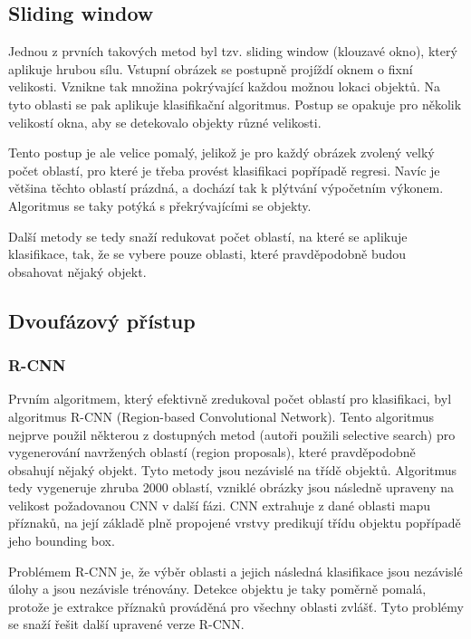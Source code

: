 \subsection{Sliding window}

Jednou z prvních takových metod byl tzv. sliding window (klouzavé okno), který
aplikuje hrubou sílu. Vstupní obrázek se postupně projíždí oknem o fixní
velikosti. Vznikne tak množina pokrývající každou možnou lokaci objektů. Na
tyto oblasti se pak aplikuje klasifikační algoritmus. Postup se opakuje pro
několik velikostí okna, aby se detekovalo objekty různé velikosti.

Tento postup je ale velice pomalý, jelikož je pro každý obrázek zvolený velký
počet oblastí, pro které je třeba provést klasifikaci popřípadě regresi. Navíc
je většina těchto oblastí prázdná, a dochází tak k plýtvání výpočetním výkonem.
Algoritmus se taky potýká s překrývajícími se objekty.

Další metody se tedy snaží redukovat počet oblastí, na které se aplikuje
klasifikace, tak, že se vybere pouze oblasti, které pravděpodobně budou
obsahovat nějaký objekt.

\subsection{Dvoufázový přístup}

\subsubsection{R-CNN}
Prvním algoritmem, který efektivně zredukoval počet oblastí pro klasifikaci,
byl algoritmus R-CNN (Region-based Convolutional Network). \cite{r-cnn} Tento
algoritmus nejprve použil některou z dostupných metod (autoři použili selective
search) pro vygenerování navržených oblastí (region proposals), které
pravděpodobně obsahují nějaký objekt. Tyto metody jsou nezávislé na třídě
objektů. Algoritmus tedy vygeneruje zhruba 2000 oblastí, vzniklé obrázky jsou
následně upraveny na velikost požadovanou CNN v další fázi. CNN extrahuje z
dané oblasti mapu příznaků, na její základě plně propojené vrstvy predikují
třídu objektu popřípadě jeho bounding box.

Problémem R-CNN je, že výběr oblasti a jejich následná klasifikace jsou
nezávislé úlohy a jsou nezávisle trénovány. Detekce objektu je taky poměrně
pomalá, protože je extrakce příznaků prováděná pro všechny oblasti zvlášť. Tyto
problémy se snaží řešit další upravené verze R-CNN.

